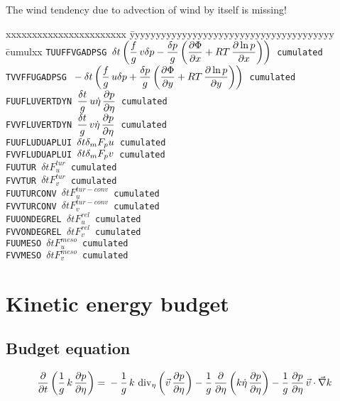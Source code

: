 The wind tendency due to advection of wind by itself is missing!
\begin{tabbing}
xxxxxxxxxxxxxxxxxxxxxxx \= yyyyyyyyyyyyyyyyyyyyyyyyyyyyyyyyyyyyyyy \= cumulxx \kill
\tt TUUFFVGADPSG \> $\displaystyle \delta t \left( \frac fg \,v\delta p - \frac{\delta p}g \left( \frac{\displaystyle \partial \Phi}{\displaystyle \partial x}  + RT
\,\frac{\displaystyle \partial \ln p}{\displaystyle \partial x} \right) \right)$ \> cumulated\\[1ex]
\tt TVVFFUGADPSG \> $\ds\mb -\delta t \lp \frac fg \,u\delta p + \frac{\delta p}g \lp \DerP{\Phi}{y}  + 
RT\,\DerP{\ln p}{y} \rp \rp$ \> cumulated\\[1ex]
\tt FUUFLUVERTDYN \> $\displaystyle \frac{\delta t}g\,u \dot\eta\,\frac{\displaystyle \partial p}{\displaystyle \partial \eta}$ \> cumulated\\[1ex]
\tt FVVFLUVERTDYN \> $\displaystyle \frac{\delta t}g\,v \dot\eta\,\frac{\displaystyle \partial p}{\displaystyle \partial \eta}$ \> cumulated\\[1ex]
\tt FUUFLUDUAPLUI \> $\displaystyle \delta t \delta_m F_{p} u$ \> cumulated\\[1ex]
\tt FVVFLUDUAPLUI \> $\displaystyle \delta t \delta_m F_{p} v$ \> cumulated\\[1ex]
\tt FUUTUR \> $\delta t F_u^{tur}$ \> cumulated\\
\tt FVVTUR \> $\delta t F_v^{tur}$ \> cumulated\\
\tt FUUTURCONV \> $\delta t F_u^{tur-conv}$ \> cumulated\\
\tt FVVTURCONV \> $\delta t F_v^{tur-conv}$ \> cumulated\\
\tt FUUONDEGREL \> $\delta t F_u^{rel}$ \> cumulated\\
\tt FVVONDEGREL \> $\delta t F_v^{rel}$ \> cumulated\\
\tt FUUMESO \> $\delta t F_u^{meso}$ \> cumulated\\
\tt FVVMESO \> $\delta t F_v^{meso}$ \> cumulated
\end{tabbing}

\section{Kinetic energy budget}

\subsection*{Budget equation}

$$
\DerP{}t \lp \frac 1g\,k\,\DerP p{\eta} \rp = 
\mb - \frac 1g\, k \,\divi{\eta}\lp \vec v\,\DerP p{\eta} \rp 
- \frac 1g \,\DerP{}{\eta} \lp k\dot\eta \,\DerP{p}{\eta} \rp 
- \frac 1g \,\DerP p{\eta}\,\vec v\cdot\grad k 
$$

